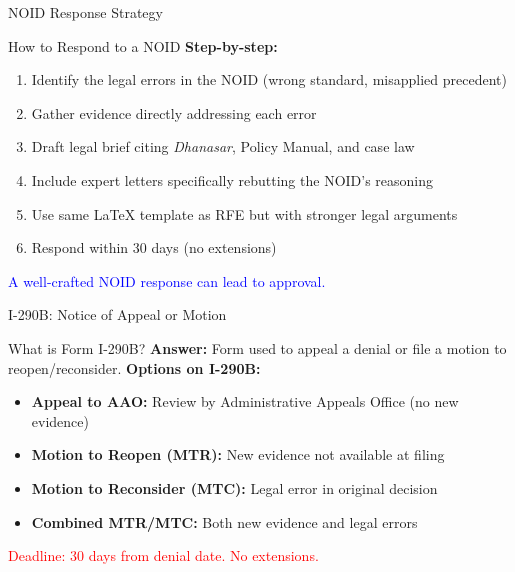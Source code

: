 \documentclass[11pt]{beamer}
\begin{document}
	\begin{frame}{NOID Response Strategy}
		\scriptsize
		\begin{block}{How to Respond to a NOID}
			\textbf{Step-by-step:}
			\begin{enumerate}
				\item Identify the legal errors in the NOID (wrong standard, misapplied precedent)
				\item Gather evidence directly addressing each error
				\item Draft legal brief citing \textit{Dhanasar}, Policy Manual, and case law
				\item Include expert letters specifically rebutting the NOID's reasoning
				\item Use same LaTeX template as RFE but with stronger legal arguments
				\item Respond within 30 days (no extensions)
			\end{enumerate}
			\textcolor{blue}{A well-crafted NOID response can lead to approval.}
		\end{block}
	\end{frame}
	
	
	\begin{frame}{I-290B: Notice of Appeal or Motion}
		\scriptsize
		\begin{block}{What is Form I-290B?}
			\textbf{Answer:} Form used to appeal a denial or file a motion to reopen/reconsider.
			\vspace{0.2cm}
			\textbf{Options on I-290B:}
			\begin{itemize}
				\item \textbf{Appeal to AAO:} Review by Administrative Appeals Office (no new evidence)
				\item \textbf{Motion to Reopen (MTR):} New evidence not available at filing
				\item \textbf{Motion to Reconsider (MTC):} Legal error in original decision
				\item \textbf{Combined MTR/MTC:} Both new evidence and legal errors
			\end{itemize}
			\textcolor{red}{Deadline: 30 days from denial date. No extensions.}
		\end{block}
	\end{frame}
	
\end{document}
